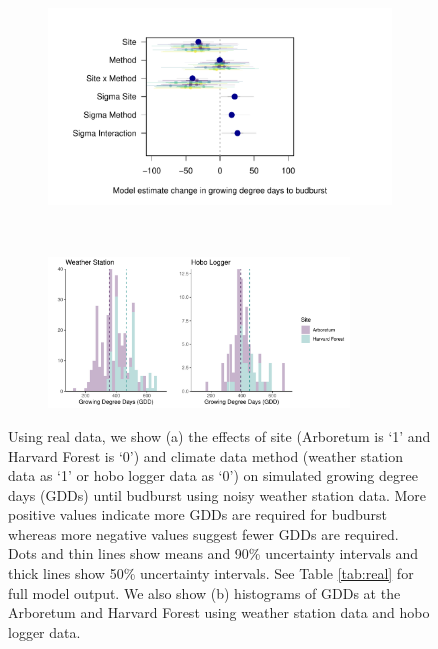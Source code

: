 \documentclass{article}\usepackage[]{graphicx}\usepackage[]{color}
\begin{document}
\begin{enumerate}
\begin{figure}[H]
  \begin{subfigure}{.5\linewidth}
    \caption{}
    \centering
    \includegraphics[height=7cm, width=11cm]{..//analyses/figures/muplot_urban_real.pdf}
    \label{fig:muplotreal}
  \end{subfigure}%
    \begin{subfigure}{.5\linewidth}
      \caption{}
      \centering
      \includegraphics[height=4cm, width=8cm]{..//analyses/figures/gdd_methods_real.pdf}
    \label{fig:gddreal}
  \end{subfigure}
\caption{ Using real data, we show (a) the effects of site (Arboretum is `1' and Harvard Forest is `0') and climate data method (weather station data as `1' or hobo logger data as `0') on simulated growing degree days (GDDs) until budburst using noisy weather station data. More positive values indicate more GDDs are required for budburst whereas more negative values suggest fewer GDDs are required. Dots and thin lines show means and 90\% uncertainty intervals and thick lines show 50\% uncertainty intervals. See Table \ref{tab:real} for full model output. We also show (b) histograms of GDDs at the Arboretum and Harvard Forest using weather station data and hobo logger data.}
\label{fig:real}
\end{figure}


\end{enumerate}
\end{document}
